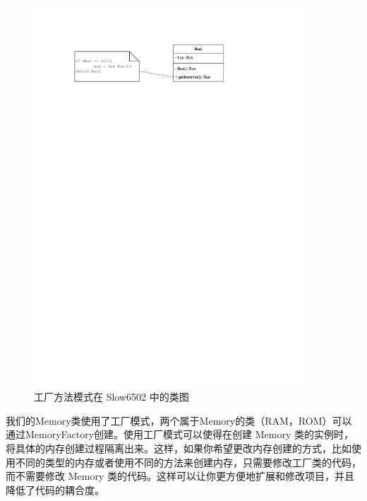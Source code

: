 \begin{figure}[htb]
  \centering
  \includegraphics[width=0.9\textwidth]{figures/单例.pdf}
  \caption{工厂方法模式在 Slow6502 中的类图}
\end{figure}

我们的Memory类使用了工厂模式，两个属于Memory的类（RAM，ROM）可以通过MemoryFactory创建。使用工厂模式可以使得在创建 Memory 类的实例时，将具体的内存创建过程隔离出来。这样，如果你希望更改内存创建的方式，比如使用不同的类型的内存或者使用不同的方法来创建内存，只需要修改工厂类的代码，而不需要修改 Memory 类的代码。这样可以让你更方便地扩展和修改项目，并且降低了代码的耦合度。

